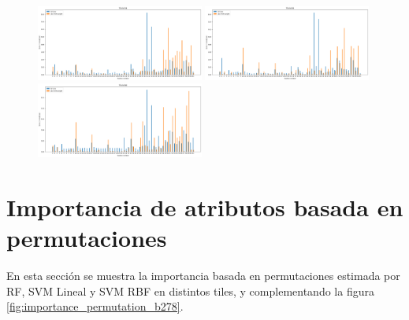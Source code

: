 \begin{appendix}
\begin{figure}[h!]
\centering
  \includegraphics[width=0.49\textwidth]{Kap6/test=b234_ML_variable_importance_scores.png} 
  \includegraphics[width=0.49\textwidth]{Kap6/test=b261_ML_variable_importance_scores.png} \\
  \includegraphics[width=0.49\textwidth]{Kap6/test=b360_ML_variable_importance_scores.png} 
\end{figure}

\section{Importancia de atributos basada en permutaciones}
\label{anexo_permutations}
En esta sección se muestra la importancia basada en permutaciones estimada por RF, SVM Lineal y SVM RBF en distintos tiles, y complementando la figura \ref{fig:importance_permutation_b278}.
 

\end{appendix}
